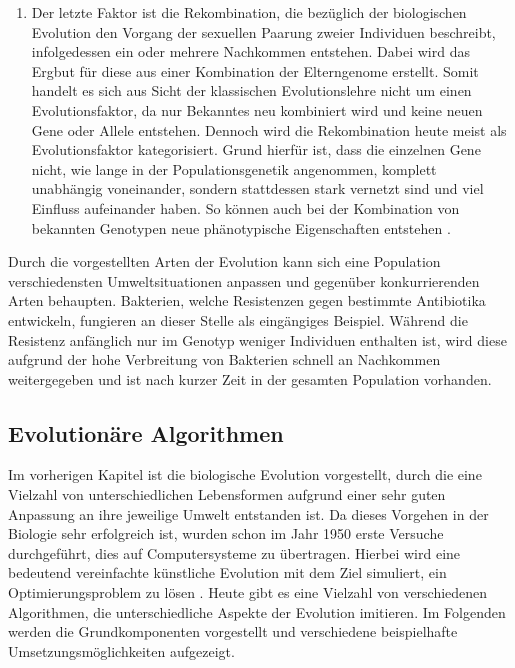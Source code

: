 \begin{enumerate}
	\item Der letzte Faktor ist die Rekombination, die bezüglich der biologischen Evolution den Vorgang der sexuellen Paarung zweier Individuen beschreibt, infolgedessen ein oder mehrere Nachkommen entstehen. Dabei wird das Ergbut für diese aus einer Kombination der Elterngenome erstellt. Somit handelt es sich aus Sicht der klassischen Evolutionslehre nicht um einen Evolutionsfaktor, da nur Bekanntes neu kombiniert wird und keine neuen Gene oder Allele entstehen. Dennoch wird die Rekombination heute meist als Evolutionsfaktor kategorisiert. Grund hierfür ist, dass die einzelnen Gene nicht, wie lange in der Populationsgenetik angenommen, komplett unabhängig voneinander, sondern stattdessen stark vernetzt sind und viel Einfluss aufeinander haben. So können auch bei der Kombination von bekannten Genotypen neue phänotypische Eigenschaften entstehen \cite{weicker2015evolutionare}.
\end{enumerate}
Durch die vorgestellten Arten der Evolution kann sich eine Population verschiedensten Umweltsituationen anpassen und gegenüber konkurrierenden Arten behaupten. Bakterien, welche Resistenzen gegen bestimmte Antibiotika entwickeln, fungieren an dieser Stelle als eingängiges Beispiel. Während die Resistenz anfänglich nur im Genotyp weniger Individuen enthalten ist, wird diese aufgrund der hohe Verbreitung von Bakterien schnell an Nachkommen weitergegeben und ist nach kurzer Zeit in der gesamten Population vorhanden.
 
\subsection{Evolutionäre Algorithmen}
\label{subsec:evolutionary_algorithm}
Im vorherigen Kapitel ist die biologische Evolution vorgestellt, durch die eine Vielzahl von unterschiedlichen Lebensformen aufgrund einer sehr guten Anpassung an ihre jeweilige Umwelt entstanden ist. Da dieses Vorgehen in der Biologie sehr erfolgreich ist, wurden schon im Jahr 1950 erste Versuche durchgeführt, dies auf Computersysteme zu übertragen. Hierbei wird eine bedeutend vereinfachte künstliche Evolution mit dem Ziel simuliert, ein Optimierungsproblem zu lösen \cite{weicker2015evolutionare}. Heute gibt es eine Vielzahl von verschiedenen Algorithmen, die unterschiedliche Aspekte der Evolution imitieren. Im Folgenden werden die Grundkomponenten vorgestellt und verschiedene beispielhafte Umsetzungsmöglichkeiten aufgezeigt.

